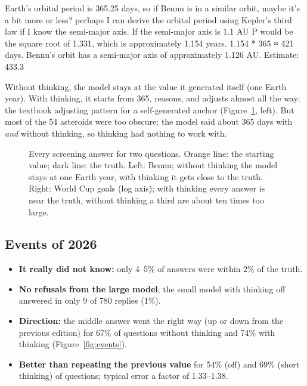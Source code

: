 \documentclass[11pt,a4paper]{article}
\begin{document}
\begin{transcript}
\cut{} Earth's orbital period is 365.25 days, so if Bennu is in a similar orbit, maybe it's a bit more or less? \cut{} perhaps I can derive the orbital period using Kepler's third law if I know the semi-major axis. \cut{} If the semi-major axis is 1.1 AU \cut{} P would be the square root of 1.331, which is approximately 1.154 years. \cut{} 1.154 * 365 ≈ 421 days. \cut{} Bennu's orbit has a semi-major axis of approximately 1.126 AU. \cut{}
 Estimate: 433.3
\end{transcript}

Without thinking, the model stays at the value it generated itself (one Earth year). With thinking, it starts from 365, reasons, and adjusts almost all the way: the textbook adjusting pattern for a self-generated anchor (Figure~\ref{fig:bennu}, left). But most of the 54 asteroids were too obscure: the model said about 365 days with \emph{and} without thinking, so thinking had nothing to work with.

\begin{figure}[ht]
\centering{}
\caption{Every screening answer for two questions. Orange line: the starting value; dark line: the truth. Left: Bennu; without thinking the model stays at one Earth year, with thinking it gets close to the truth. Right: World Cup goals (log axis); with thinking every answer is near the truth, without thinking a third are about ten times too large.}
\label{fig:bennu}
\end{figure}

\subsection{Events of 2026}
\begin{itemize}[leftmargin=*]
  \item \textbf{It really did not know:} only 4--5\% of answers were within 2\% of the truth.
  \item \textbf{No refusals from the large model}; the small model with thinking off answered in only 9 of 780 replies (1\%).
  \item \textbf{Direction:} the middle answer went the right way (up or down from the previous edition) for 67\% of questions without thinking and 74\% with thinking (Figure~\ref{fig:events}).
  \item \textbf{Better than repeating the previous value} for 54\% (off) and 69\% (short thinking) of questions; typical error a factor of 1.33--1.38.
\end{itemize}
\end{document}

